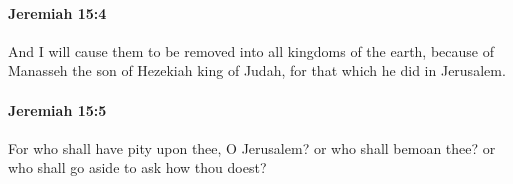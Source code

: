 		\paragraph{Jeremiah 15:4} %
			\label{JEREMIAH-15-4}

			And I will cause them to be removed into all kingdoms of the earth, because of Manasseh the son of Hezekiah king of Judah, for that which he did in Jerusalem.


		\paragraph{Jeremiah 15:5} %
			\label{JEREMIAH-15-5}

			For who shall have pity upon thee, O Jerusalem? or who shall bemoan thee? or who shall go aside to ask how thou doest?


